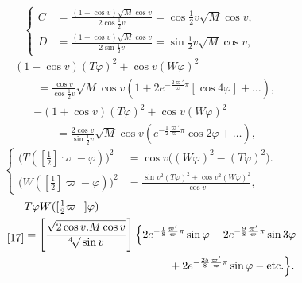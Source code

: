 \begin{equation*}\tag*{[13]}
\left\{\begin{aligned}
C&=\frac{(1+\cos v)\surd M\cos v}{2\cos\frac12v}=\cos\tfrac12v\surd M\cos v,\\
D&=\frac{(1-\cos v)\surd M\cos v}{2\sin\frac12v}=\sin\tfrac12v\surd M\cos v,
\end{aligned}\right.
\end{equation*}
\begin{equation*}\tag*{[14]}
\begin{aligned}
&(1-\cos v)(T\varphi)^2+\cos v(W\varphi)^2\\
&\qquad=\frac{\cos v}{\cos\frac12v}\surd M\cos v
\left(1+2e^{-\frac{2\varpi'}\varpi\pi}[\cos4\varphi]+\ldots\right),
\end{aligned}
\end{equation*}
\begin{equation*}\tag*{[15]}
\begin{aligned}
&-(1+\cos v)(T\varphi)^2+\cos v(W\varphi)^2\\
&\qquad=\frac{2\cos v}{\sin\frac12v}\surd M\cos v
\left(e^{-\frac12\frac{\varpi'}\varpi\pi}\cos2\varphi+\ldots\right),
\end{aligned}
\end{equation*}
\begin{equation*}\tag*{[16]}
\left\{\begin{aligned}
\bigl(T([\tfrac12]\varpi-\varphi)\bigr)^2&=\cos v\bigl((W\varphi)^2-(T\varphi)^2\bigr).\\
\bigl(W([\tfrac12]\varpi-\varphi)\bigr)^2&=\frac{\sin v^2(T\varphi)^2+\cos v^2(W\varphi)^2}{\cos v},
\end{aligned}\right.
\end{equation*}
\begin{equation*}\tag*{[17]}
\begin{aligned}
&T\varphi W([\tfrac12\varpi-]\varphi)\\
&=\left[\frac{\sqrt{2\cos v.M\cos v}}{{}^4\!\surd\sin v}\right]
\Bigl\{2e^{-\frac18\frac{\varpi'}\varpi\pi}\sin\varphi
-2e^{-\frac98\frac{\varpi'}\varpi\pi}\sin3\varphi\\
&\hspace{13em}+2e^{-\frac{25}8\frac{\varpi'}\varpi\pi}\sin\varphi-\text{etc.}\Bigr\}.
\end{aligned}
\end{equation*}
\ClosingRule
\noindent [S.\ 32]
{\small
\[\begin{aligned}
(S\varphi)^2=P+2Q\Biggl\{&\frac{\cos2\varphi}{e^{\frac{\pi\varpi'}\varpi}-e^{-\frac{\pi\varpi'}\varpi}}
-\frac{2\cos4\varphi}{e^{2\frac{\varpi'\pi}\varpi}-e^{-2\frac{\varpi'\pi}\varpi}}\\
&+\frac{3\cos6\varphi}{[e^{3\frac{\varpi'\pi}\varpi}-e^{-3\frac{\varpi'\pi}\varpi}]}-\ldots\Biggr\}.
\end{aligned}\]}
